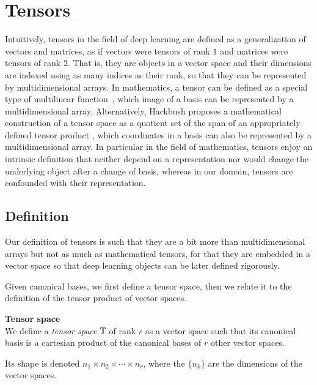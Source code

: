\section{Tensors}

Intuitively, tensors in the field of deep learning are defined as a generalization of vectors and matrices, as if vectors were tensors of rank $1$ and matrices were tensors of rank $2$. That is, they are objects in a vector space and their dimensions are indexed using as many indices as their rank, so that they can be represented by multidimensional arrays. In mathematics, a tensor can be defined as a special type of multilinear function~\citep{bass1968cours, marcus1975finite, williamson2015tensor}, which image of a basis can be represented by a multidimensional array. Alternatively, Hackbush proposes a mathematical construction of a tensor space as a quotient set of the span of an appropriately defined tensor product \citep{hackbusch2012tensor}, which coordinates in a basis can also be represented by a multidimensional array. In particular in the field of mathematics, tensors enjoy an intrinsic definition that neither depend on a representation nor would change the underlying object after a change of basis, whereas in our domain, tensors are confounded with their representation.

\subsection{Definition}

Our definition of tensors is such that they are a bit more than multidimensional arrays but not as much as mathematical tensors, for that they are embedded in a vector space so that deep learning objects can be later defined rigorously.

Given canonical bases, we first define a tensor space, then we relate it to the definition of the tensor product of vector spaces.

\begin{definition}\textbf{Tensor space}\\
\label{def:tensor}
We define a \emph{tensor space} $\mathbb{T}$ of rank $r$ as a vector space such that its canonical basis is a cartesian product of the canonical bases of $r$ other vector spaces.

Its shape is denoted $n_1 \times n_2 \times \cdots \times n_r$, where the $\{n_k\}$ are the dimensions of the vector spaces.
\end{definition}

